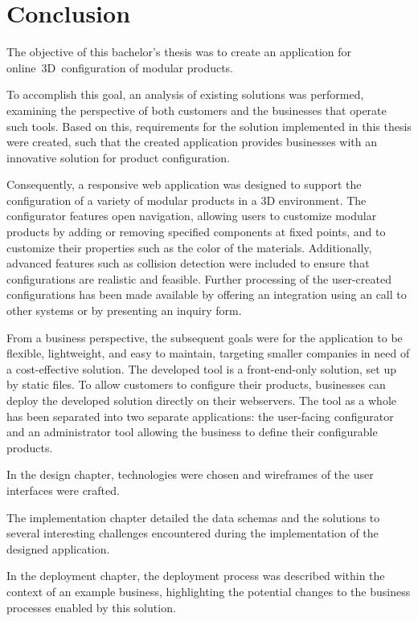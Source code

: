 \chapter{Conclusion}

The objective of this bachelor's thesis was to create an application for online~3D~configuration of modular products.

To accomplish this goal, an analysis of existing solutions was performed, examining the perspective of both customers and the businesses that operate such tools. Based on this, requirements for the solution implemented in this thesis were created, such that the created application provides businesses with an innovative solution for product configuration.

Consequently, a responsive web application was designed to support the configuration of a variety of modular products in a 3D environment. The configurator features open navigation, allowing users to customize modular products by adding or removing specified components at fixed points, and to customize their properties such as the color of the materials. Additionally, advanced features such as collision detection were included to ensure that configurations are realistic and feasible. Further processing of the user-created configurations has been made available by offering an integration using an  call to other systems or by presenting an inquiry form.

From a business perspective, the subsequent goals were for the application to be flexible, lightweight, and easy to maintain, targeting smaller companies in need of a cost-effective solution. The developed tool is a front-end-only solution, set up by static files. To allow customers to configure their products, businesses can deploy the developed solution directly on their webservers. The tool as a whole has been separated into two separate applications: the user-facing configurator and an administrator tool allowing the business to define their configurable products.

In the design chapter, technologies were chosen and wireframes of the user interfaces were crafted.

The implementation chapter detailed the data schemas and the solutions to several interesting challenges encountered during the implementation of the designed application.

In the deployment chapter, the deployment process was described within the context of an example business, highlighting the potential changes to the business processes enabled by this solution.

